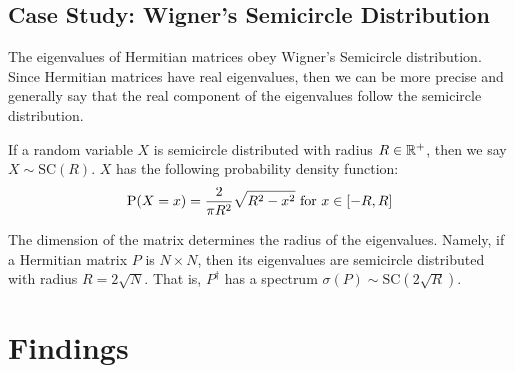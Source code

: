 \subsection{Case Study: Wigner's Semicircle Distribution}

The eigenvalues of Hermitian matrices obey Wigner's Semicircle distribution. Since Hermitian matrices have real eigenvalues, then we can be more precise and generally say that the real component of the eigenvalues follow the semicircle distribution.

\begin{definition}
If a random variable $X$ is semicircle distributed with radius $R \in \mathbb{R}^+$, then we say $X \sim \text{SC}(R)$. $X$ has the following probability density function:
$$\text{P}(X = x) = \frac{2}{\pi R^2} \sqrt{R^2 - x^2} \text{ for } x \in [-R, R]$$
\end{definition}


\begin{remark}
The dimension of the matrix determines the radius of the eigenvalues. Namely, if a Hermitian matrix $P$ is $N \times N$, then its eigenvalues are semicircle distributed with radius $R = 2\sqrt{N}$. That is, $P^{\dagger}$ has a spectrum $\sigma({P}) \sim \text{SC}(2\sqrt{R})$.
\end{remark}


\section{Findings}
